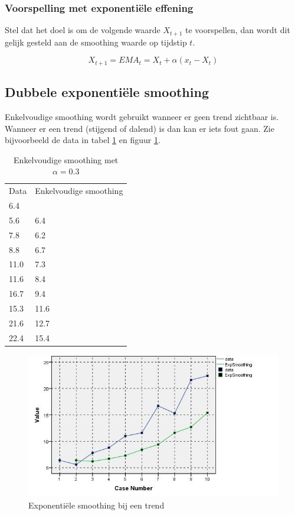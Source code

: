 \subsubsection{Voorspelling met exponenti\"ele effening}
Stel dat het doel is om de volgende waarde $X_{t+1}$ te voorspellen, dan wordt dit gelijk gesteld aan de smoothing waarde op tijdstip $t$.

\begin{equation}
	X_{t+1} = EMA_t = X_t + \alpha(x_t - X_t)
	\label{eq:EMA}
\end{equation}

\subsection{Dubbele exponenti\"ele smoothing}
Enkelvoudige smoothing wordt gebruikt wanneer er geen trend zichtbaar is. Wanneer er een trend (stijgend of dalend) is dan kan er iets fout gaan. Zie bijvoorbeeld de data in tabel \ref{tab:trend} en figuur \ref{fig:tijdreeks61}.

\begin{table}
\centering
    \begin{tabular}{|ll|}
    \hline
    Data & Enkelvoudige smoothing \\
    6.4  & ~                      \\
    5.6  & 6.4                    \\
    7.8  & 6.2                    \\
    8.8  & 6.7                    \\
    11.0 & 7.3                    \\
    11.6 & 8.4                    \\
    16.7 & 9.4                    \\
    15.3 & 11.6                   \\
    21.6 & 12.7                   \\
    22.4 & 15.4                   \\ \hline
    \end{tabular}
		\caption{Enkelvoudige smoothing met $\alpha = 0.3$}
		\label{tab:trend}
\end{table}

\begin{figure}
	\centering
		\includegraphics[width=1.00\textwidth]{images/tijdsreeksen/tijdsreeks61.jpg}
	\caption{Exponenti\"ele smoothing bij een trend}
	\label{fig:tijdreeks61}
\end{figure}

